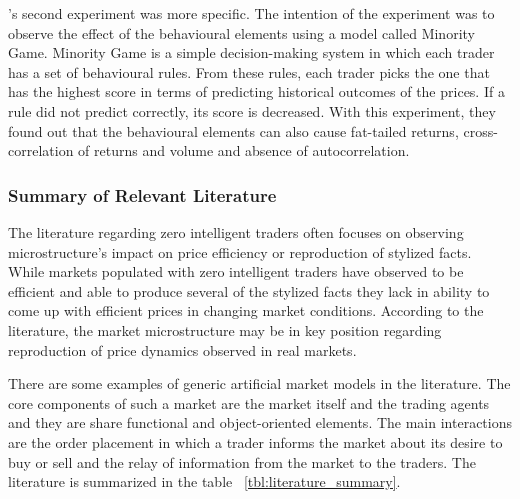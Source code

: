 \citet{LIU20082535}'s second experiment was more specific. The intention of the experiment 
was to observe the effect of the behavioural elements using a model called
Minority Game. Minority Game is a simple decision-making system in
which each trader has a set of behavioural rules. From these rules, each
trader picks the one that has the highest score in terms of predicting 
historical outcomes of the prices. If a rule did not predict correctly,
its score is decreased. With this experiment, they found out that the
behavioural elements can also cause fat-tailed returns, cross-correlation 
of returns and volume and absence of autocorrelation.


\subsubsection{Summary of Relevant Literature}

The literature regarding zero intelligent traders often focuses 
on observing microstructure's impact on price efficiency or reproduction 
of stylized facts. While markets populated with zero intelligent traders 
have observed to be efficient and able to produce several of the stylized 
facts they lack in ability to come up with efficient prices in changing 
market conditions. According to the literature, the market microstructure 
may be in key position regarding reproduction of price dynamics observed 
in real markets. 

There are some examples of generic artificial market models in the literature. 
The core components of such a market are the market itself and the trading agents 
and they are share functional and object-oriented elements. The main interactions 
are the order placement in which a trader informs the market about its desire to 
buy or sell and the relay of information from the market to the traders. The 
literature is summarized in the table ~\ref{tbl:literature_summary}.



